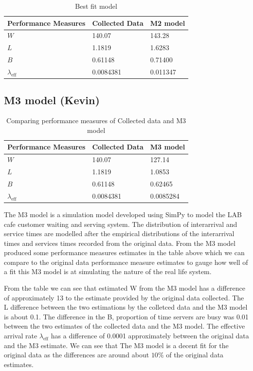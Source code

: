 \documentclass{article}
\begin{document}
\begin{table}[H]
    \centering
    \caption{Best fit model}
    \begin{tabu}{*{3}{X[c]}}
        \toprule
        \textbf{Performance Measures} & \textbf{Collected Data} & \textbf{M2 model}\\
        \midrule
        $W$ & 140.07 & 143.28\\
        $L$ & 1.1819 & 1.6283\\
        $B$ & 0.61148 & 0.71400\\
        $\lambda_{\text{eff}}$ & 0.0084381 & 0.011347\\
        \bottomrule
    \end{tabu}
    \label{tab:M2}
\end{table}



\subsection{M3 model (Kevin)}

\begin{table}[h!]
    \centering
    \caption{Comparing performance measures of Collected data and M3 model}
    \begin{tabu}{*{3}{X[c]}}
        \toprule
        \textbf{Performance Measures} & \textbf{Collected Data} & \textbf{M3 model}\\
        \midrule
        $W$ & 140.07 & 127.14\\
        $L$ & 1.1819 & 1.0853\\
        $B$ & 0.61148 & 0.62465\\
        $\lambda_{\text{eff}}$ & 0.0084381 & 0.0085284\\
        \bottomrule
    \end{tabu}
    \label{tab:M3}
\end{table}

The M3 model is a simulation model developed using SimPy to model the LAB cafe customer waiting and serving system. The distribution of interarrival and service times are modelled after the empirical distributions of the interarrival times and services times recorded from the original data. From the M3 model produced some performance measures estimates in the table above which we can compare to the original data performance measure estimates to gauge how well of a fit this M3 model is at simulating the nature of the real life system.

From the table we can see that estimated W from the M3 model has a difference of approximately 13 to the estimate provided by the original data collected. The L difference between the two estimations by the colletced data and the M3 model is about 0.1. The difference in the B, proportion of time servers are busy was 0.01 between the two estimates of the collected data and the M3 model. The effective arrival rate $\lambda_{\text{eff}}$ has a difference of 0.0001 approximately between the original data and the M3 estimate. We can see that The M3 model is a decent fit for the original data as the differences are around about $10\%$ of the original data estimates.
\end{document}
